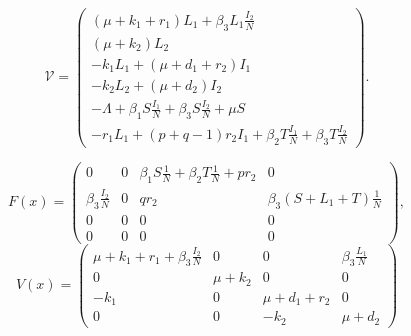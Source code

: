     \begin{equation*}
        \mathscr{V} = 
            \begin{pmatrix}
                (\mu + k_1 + r_1)L_{1} +  \beta_{3} L_{1}\frac{I_2}{N} \\
                (\mu + k_2)L_2 \\
                - k_1 L_{1} + (\mu + d_1 + r_2)I_1 \\
                - k_2 L_2 + (\mu + d_2)I_2 \\
                - \Lambda + \beta_{1} S \frac{I_1}{N} + \beta_{3}S\frac{I_2}{N} + \mu S \\
                - r_1 L_{1} + (p+q - 1)r_2 I_1 + \beta_{2} T \frac{I_1}{N} + \beta_{3}T\frac{I_2}{N}  
            \end{pmatrix}.
    \end{equation*}
    
    \begin{equation*}
        F(x) = 
            \begin{pmatrix}
                0 & 0 & \beta_{1} S \frac{1}{N} + \beta_{2} T \frac{1}{N} + p r_2 & 0 \\
                \beta_{3}\frac{I_2}{N} & 0 &   q r_2  &   \beta_{3} (S + L_{1} + T)\frac{1}{N} \\
        		0 & 0 & 0 & 0 \\
    		    0 & 0 & 0 & 0
            \end{pmatrix},
    \end{equation*}
    \begin{equation*}
        V(x) =
            \begin{pmatrix}
                \mu + k_1 + r_1 +  \beta_{3} \frac{I_2}{N} & 0 & 0 & \beta_{3} \frac{L_1}{N} \\
                0 & \mu + k_2 & 0 & 0 \\
                -k_1 & 0 & \mu + d_1 + r_2 & 0 \\
                0 & 0 & -k_2 & \mu + d_2 
            \end{pmatrix}
    \end{equation*}
    
